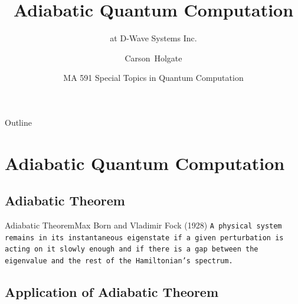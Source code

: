 \documentclass{beamer}
\title[D-Wave] %
{Adiabatic Quantum Computation}
\subtitle
{at D-Wave Systems Inc.}
\author[Carson Holgate] %
{Carson~Holgate}
\institute[NCSU] %
{
  \inst{}
  Computer Science\\
  Math\\
  NCSU
}
\date[MA591 2010] %
{MA 591 Special Topics in Quantum Computation}
\begin{document}
\begin{frame}
  \titlepage
\end{frame}

\begin{frame}{Outline}
  \tableofcontents
\end{frame}





\section{Adiabatic Quantum Computation}

\subsection{Adiabatic Theorem}

\begin{frame}{Adiabatic Theorem}{Max Born and Vladimir Fock (1928)}
  \texttt{A physical system remains in its instantaneous eigenstate if a given perturbation is acting on it slowly enough and if there is a gap between the eigenvalue and the rest of the Hamiltonian's spectrum.}
  
\end{frame}

\subsection{Application of Adiabatic Theorem}
\end{document}
